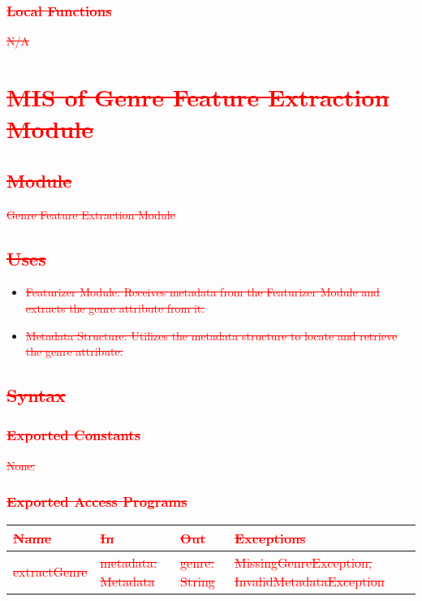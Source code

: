 \documentclass[12pt, titlepage]{article}
\begin{document}
\subsubsection{\textcolor{red}{\sout{Local Functions}}}
\textcolor{red}{\sout{N/A}}


\section{\textcolor{red}{\sout{MIS of Genre Feature Extraction Module}}} %

\subsection{\textcolor{red}{\sout{Module}}}
\textcolor{red}{\sout{Genre Feature Extraction Module}}

\subsection{\textcolor{red}{\sout{Uses}}}
\begin{itemize}
\item \textcolor{red}{\sout{Featurizer Module: Receives metadata from the Featurizer Module and extracts the genre attribute from it.}}
\item \textcolor{red}{\sout{Metadata Structure: Utilizes the metadata structure to locate and retrieve the genre attribute.}}
\end{itemize}

\subsection{\textcolor{red}{\sout{Syntax}}}

\subsubsection{\textcolor{red}{\sout{Exported Constants}}}
\textcolor{red}{\sout{None.}}

\subsubsection{\textcolor{red}{\sout{Exported Access Programs}}}

\begin{center}
\begin{tabular}{p{2cm} p{4cm} p{4cm} p{2cm}}
\hline
\textcolor{red}{\sout{\textbf{Name}}} & \textcolor{red}{\sout{\textbf{In}}} & \textcolor{red}{\sout{\textbf{Out}}} & \textcolor{red}{\sout{\textbf{Exceptions}}} \\
\hline
\textcolor{red}{\sout{extractGenre}} & \textcolor{red}{\sout{metadata: Metadata}} & \textcolor{red}{\sout{genre: String}} & \textcolor{red}{\sout{MissingGenreException, InvalidMetadataException}} \\
\hline
\end{tabular}
\end{center}
\end{document}
